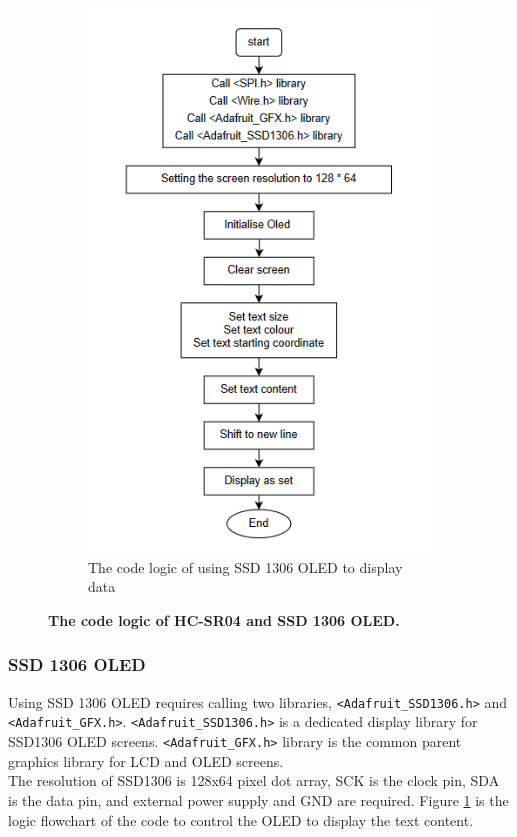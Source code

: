 \begin{figure}[H]
\begin{subfigure}{0.45\textwidth}
        \includegraphics[width=\linewidth]{Image/Design/code_logic_display.png}
        \caption{\centering The code logic of using SSD 1306 OLED to display data}
        \label{fig:cl_oled}
    \end{subfigure}
    \caption[The code logic of HC-SR04 and SSD 1306 OLED]
    {\centering \textbf{The code logic of HC-SR04 and SSD 1306 OLED.}}
    \label{fig:cl_tof_oled}
\end{figure}
\subsubsection{SSD 1306 OLED}
Using SSD 1306 OLED requires calling two libraries, \lstinline{<Adafruit_SSD1306.h>} and 
\lstinline{<Adafruit_GFX.h>}. \lstinline{<Adafruit_SSD1306.h>} is a dedicated display library for SSD1306 OLED 
screens. \lstinline{<Adafruit_GFX.h>} library is the common parent graphics library for LCD and OLED screens. \\
The resolution of SSD1306 is 128x64 pixel dot array, SCK is the clock pin, SDA is the data pin, and external 
power supply and GND are required. Figure \ref{fig:cl_oled} is the logic flowchart of the code to control the 
OLED to display the text content.






\newpage 